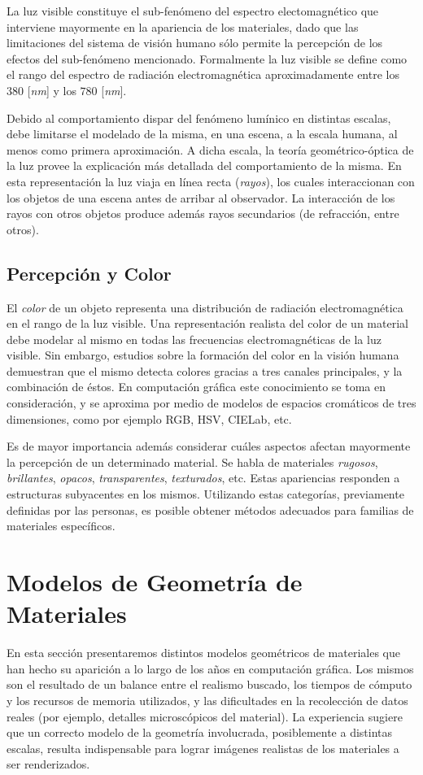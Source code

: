 La luz visible constituye el sub-fenómeno del espectro electomagnético que interviene mayormente en la apariencia de los materiales, dado que las limitaciones del sistema de visión humano sólo permite la percepción de los efectos del sub-fenómeno mencionado.
Formalmente la luz visible se define como el rango del espectro de radiación electromagnética aproximadamente entre los  $380$ [{\em nm}] y los $780$ [{\em nm}].

Debido al comportamiento dispar del fenómeno lumínico en distintas escalas, debe limitarse el modelado de la misma, en una escena, a la escala humana, al menos como primera aproximación.
A dicha escala, la teoría geométrico-óptica de la luz provee la explicación más detallada del comportamiento de la misma.
En esta representación la luz viaja en línea recta ({\em rayos}), los cuales interaccionan con los objetos de una escena antes de arribar al observador.
La interacción de los rayos con otros objetos produce además rayos secundarios (de refracción, entre otros).

\subsection{Percepción y Color}
El {\em color} de un objeto representa una distribución de radiación electromagnética en el rango de la luz visible.
Una representación realista del color de un material debe modelar al mismo en todas las frecuencias electromagnéticas de la luz visible.
Sin embargo, estudios sobre la formación del color en la visión humana demuestran que el mismo detecta colores gracias a tres canales principales, y la combinación de éstos.
En computación gráfica este conocimiento se toma en consideración, y se aproxima por medio de modelos de espacios cromáticos de tres dimensiones, como por ejemplo \acrshort{RGB}, \acrshort{HSV}, CIELab, etc.

Es de mayor importancia además considerar cuáles aspectos afectan mayormente la percepción de un determinado material.
Se habla de materiales {\em rugosos}, {\em brillantes}, {\em opacos}, {\em transparentes}, {\em texturados}, etc.
Estas apariencias responden a estructuras subyacentes en los mismos.
Utilizando estas categorías, previamente definidas por las personas, es posible obtener métodos adecuados para familias de materiales específicos.

\section{Modelos de Geometría de Materiales}
En esta sección presentaremos distintos modelos geométricos de materiales que han hecho su aparición a lo largo de los años en computación gráfica.
Los mismos son el resultado de un balance entre el realismo buscado, los tiempos de cómputo y los recursos de memoria utilizados, y las dificultades en la recolección de datos reales (por ejemplo, detalles microscópicos del material).
La experiencia sugiere que un correcto modelo de la geometría involucrada, posiblemente a distintas escalas, resulta indispensable para lograr imágenes realistas de los materiales a ser renderizados.

